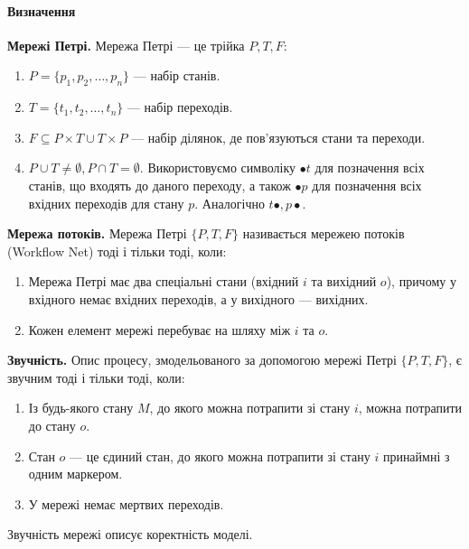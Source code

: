 \documentclass{memoir}
\begin{document}
\paragraph{Визначення}

\textbf{Мережі Петрі.} Мережа Петрі — це трійка \( P, T, F \):

\begin{enumerate}
    \item \( P = \{ p_1, p_2, \ldots, p_n \} \) — набір станів.
    \item \( T = \{ t_1, t_2, \ldots, t_n \} \) — набір переходів.
    \item \( F \subseteq P \times T \cup T \times P \) — набір ділянок, де пов’язуються стани та переходи.
    \item \( P \cup T \neq \emptyset, P \cap T = \emptyset \). Використовуємо символіку \( \bullet t \) для позначення всіх станів, що входять до даного переходу, а також \( \bullet p \) для позначення всіх вхідних переходів для стану \( p \). Аналогічно \( t \bullet, p \bullet \).
\end{enumerate}

\textbf{Мережа потоків.} Мережа Петрі \( \{ P, T, F \} \) називається мережею потоків (Workflow Net) тоді і тільки тоді, коли:

\begin{enumerate}
    \item Мережа Петрі має два спеціальні стани (вхідний \( i \) та вихідний \( o \)), причому у вхідного немає вхідних переходів, а у вихідного — вихідних.
    \item Кожен елемент мережі перебуває на шляху між \( i \) та \( o \).
\end{enumerate}

\textbf{Звучність.} Опис процесу, змодельованого за допомогою мережі Петрі \( \{ P, T, F \} \), є звучним тоді і тільки тоді, коли:

\begin{enumerate}
    \item Із будь-якого стану \( M \), до якого можна потрапити зі стану \( i \), можна потрапити до стану \( o \).
    \item Стан \( o \) — це єдиний стан, до якого можна потрапити зі стану \( i \) принаймні з одним маркером.
    \item У мережі немає мертвих переходів.
\end{enumerate}

Звучність мережі описує коректність моделі.
\end{document}
